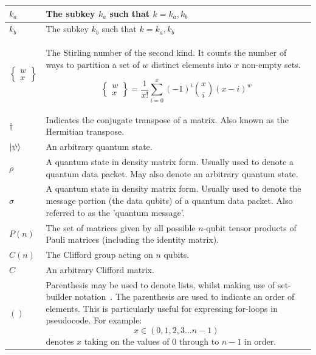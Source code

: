 \begin{xltabular}{\linewidth}{ l | X }
$k_a$ & The subkey $k_a$ such that $k = k_a,k_b$
\\ \hline

$k_b$ & The subkey $k_b$ such that $k = k_a,k_b$
\\ \hline

$\left\{\begin{smallmatrix}w\\x\end{smallmatrix}\right\}$ & The Stirling number of the second kind. It counts the number of ways to partition a set of $w$ distinct elements into $x$ non-empty sets.

\begin{equation}
\left\{\begin{smallmatrix}w\\x\end{smallmatrix}\right\} = \frac{1}{x !} \sum_{i=0}^{x}(-1)^{i}{x \choose i}(x-i)^{w}
\end{equation}
\\ \hline 

$\dagger$ & Indicates the conjugate transpose of a matrix. Also known as the Hermitian transpose.
\\ \hline

$\ket{\psi}$ & An arbitrary quantum state.
\\ \hline

$\rho$ & A quantum state in density matrix form. Usually used to denote a quantum data packet. May also denote an arbitrary quantum state.
\\ \hline

$\sigma$ & A quantum state in density matrix form. Usually used to denote the message portion (the data qubits) of a quantum data packet. Also referred to as the 'quantum message'.
\\ \hline

$P(n)$ & The set of matrices given by all possible $n$-qubit tensor products of Pauli matrices (including the identity matrix).
\\ \hline

$C(n)$ & The Clifford group acting on $n$ qubits.
\\ \hline

$C$ & An arbitrary Clifford matrix.
\\ \hline

$()$ & Parenthesis may be used to denote lists, whilst making use of set-builder notation~\cite{setBuilderNotationWikipedia}. The parenthesis are used to indicate an order of elements. This is particularly useful for expressing for-loops in pseudocode. For example:
$$x \in (0,1,2,3... n-1)$$
denotes $x$ taking on the values of $0$ through to $n-1$ in order.
\\ \hline


\end{xltabular}
